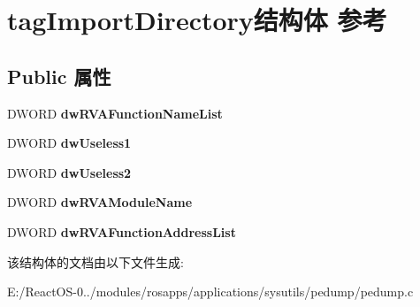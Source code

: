 \hypertarget{structtag_import_directory}{}\section{tag\+Import\+Directory结构体 参考}
\label{structtag_import_directory}
\subsection*{Public 属性}
\begin{DoxyCompactItemize}
\item 
\mbox{\label{structtag_import_directory_ab8a01dd70aba0e169cdea939452ba0df}} 
D\+W\+O\+RD {\bfseries dw\+R\+V\+A\+Function\+Name\+List}
\item 
\mbox{\label{structtag_import_directory_ad925772ca99ef171eb336bf1525ec4c6}} 
D\+W\+O\+RD {\bfseries dw\+Useless1}
\item 
\mbox{\label{structtag_import_directory_af98700c213dc6e94c9892b9bc5ef1f93}} 
D\+W\+O\+RD {\bfseries dw\+Useless2}
\item 
\mbox{\label{structtag_import_directory_a8fcc6742cd20aa234331c8a27e7cb177}} 
D\+W\+O\+RD {\bfseries dw\+R\+V\+A\+Module\+Name}
\item 
\mbox{\label{structtag_import_directory_a24cf3a45d8355faf8be55b47c6b52e6f}} 
D\+W\+O\+RD {\bfseries dw\+R\+V\+A\+Function\+Address\+List}
\end{DoxyCompactItemize}


该结构体的文档由以下文件生成\+:\begin{DoxyCompactItemize}
\item 
E\+:/\+React\+O\+S-\/0../modules/rosapps/applications/sysutils/pedump/pedump.\+c\end{DoxyCompactItemize}
